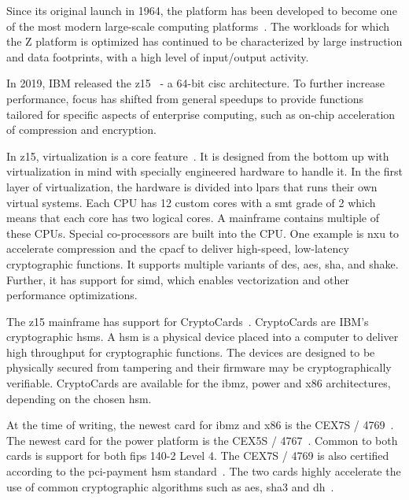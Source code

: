 Since its original launch in 1964, the platform has been developed to become one of the most modern large-scale computing platforms~\cite{jacobi2020}. The workloads for which the Z platform is optimized has continued to be characterized by large instruction and data footprints, with a high level of input/output activity.

In 2019, IBM released the \gls{z15}~\cite{jacobi2020} - a 64-bit \gls{cisc} architecture. To further increase performance, focus has shifted from general speedups to provide functions tailored for specific aspects of enterprise computing, such as on-chip acceleration of compression and encryption.

In \gls{z15}, virtualization is a core feature~\cite{redbook:z15}. It is designed from the bottom up with virtualization in mind with specially engineered hardware to handle it. In the first layer of virtualization, the hardware is divided into \glspl{lpar} that runs their own virtual systems. Each CPU has 12 custom cores with a \gls{smt} grade of 2 which means that each core has two logical cores. A mainframe contains multiple of these CPUs. Special co-processors are built into the CPU. One example is \gls{nxu} to accelerate compression and the \gls{cpacf} to deliver high-speed, low-latency cryptographic functions. It supports multiple variants of \gls{des}, \gls{aes}, \gls{sha}, and \gls{shake}. Further, it has support for \gls{simd}, which enables vectorization and other performance optimizations.

The \gls{z15} mainframe has support for CryptoCards~\cite{ibm:hsms}. CryptoCards are IBM's cryptographic \glspl{hsm}. A \gls{hsm} is a physical device placed into a computer to deliver high throughput for cryptographic functions. The devices are designed to be physically secured from tampering and their firmware may be cryptographically verifiable. CryptoCards are available for the \gls{ibmz}, \gls{power} and \gls{x86} architectures, depending on the chosen \gls{hsm}.

At the time of writing, the newest card for \gls{ibmz} and \gls{x86} is the CEX7S / 4769~\cite{ibm:4769}. The newest card for the \gls{power} platform is the CEX5S / 4767~\cite{ibm:4767}. Common to both cards is support for both \gls{fips} 140-2 Level 4. The CEX7S / 4769 is also certified according to the \gls{pci-payment} \gls{hsm} standard~\cite{ibm:4769,ibm:4767}. The two cards highly accelerate the use of common cryptographic algorithms such as \gls{aes}, \gls{sha3} and \gls{dh}~\cite{ibm:4767,ibm:4769}.
